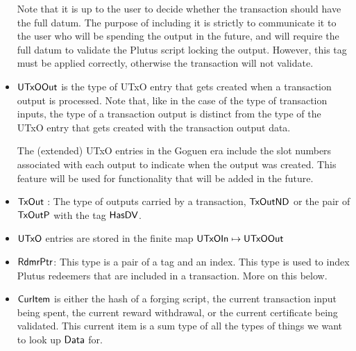 \begin{itemize}
  Note that it is up to the user
  to decide whether the transaction should have the full datum. The purpose of
  including it is strictly to communicate it to the user who will be spending
  the output in the future, and will require the full datum to validate
  the Plutus script locking the output. However, this tag must be applied
  correctly, otherwise the transaction will not validate.

  \item $\mathsf{UTxOOut}$ is the type of UTxO entry that gets created when a transaction
  output is processed. Note that, like in the case of the type of transaction inputs,
  the type of a transaction output is distinct from the type of the
  UTxO entry that gets created with the transaction output data.

  The (extended) UTxO entries in the Goguen era include the slot numbers associated with each output
  to indicate when the output was created.
  This feature will be used for functionality that will be added in the future.

  \item $\mathsf{TxOut}$ : The type of outputs carried by a transaction,
  $\mathsf{TxOutND}$ or the pair of $\mathsf{TxOutP}$ with the tag $\mathsf{HasDV}$.

  \item $\mathsf{UTxO}$ entries are stored in the finite map $\mathsf{UTxOIn}\mapsto \mathsf{UTxOOut}$

  \item $\mathsf{RdmrPtr}$: This type is a pair of a tag and an index. This type is
  used to index Plutus redeemers that are included in a transaction. More on this
  below.

  \item $\mathsf{CurItem}$ is either the hash of a
  forging script, the current transaction input being
  spent, the current reward
  withdrawal, or the current certificate being validated.
  This current item is a sum type of all the types of things we want to
  look up $\mathsf{Data}$ for.

\end{itemize}


